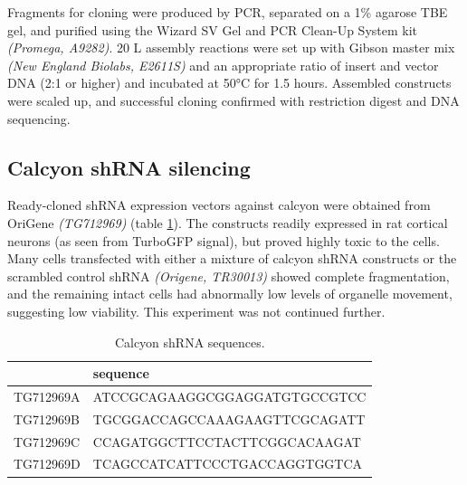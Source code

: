 \documentclass[
  12pt,
  a4paper,
]{book}
\begin{document}
Fragments for cloning were produced by PCR, separated on a 1\% agarose TBE gel, and purified using the Wizard SV Gel and PCR Clean-Up System kit \emph{(Promega, A9282)}. 20 \textmu{}L assembly reactions were set up with Gibson master mix \emph{(New England Biolabs, E2611S)} and an appropriate ratio of insert and vector DNA (2:1 or higher) and incubated at 50°C for 1.5 hours. Assembled constructs were scaled up, and successful cloning confirmed with restriction digest and DNA sequencing.

\begin{table}

\caption{\label{tab:primer-table}Gibson cloning primers.}
\centering
{}
\end{table}

\hypertarget{calcyon-shrna-silencing}{%
\subsection{Calcyon shRNA silencing}\label{calcyon-shrna-silencing}}

Ready-cloned shRNA expression vectors against calcyon were obtained from OriGene \emph{(TG712969)} (table \ref{tab:caly-tab}). The constructs readily expressed in rat cortical neurons (as seen from TurboGFP signal), but proved highly toxic to the cells. Many cells transfected with either a mixture of calcyon shRNA constructs or the scrambled control shRNA \emph{(Origene, TR30013)} showed complete fragmentation, and the remaining intact cells had abnormally low levels of organelle movement, suggesting low viability. This experiment was not continued further.

\begin{table}

\caption{\label{tab:caly-tab}Calcyon shRNA sequences.}
\centering
\begin{tabular}[t]{ll}
\toprule
  & sequence\\
\midrule
TG712969A & ATCCGCAGAAGGCGGAGGATGTGCCGTCC\\
TG712969B & TGCGGACCAGCCAAAGAAGTTCGCAGATT\\
TG712969C & CCAGATGGCTTCCTACTTCGGCACAAGAT\\
TG712969D & TCAGCCATCATTCCCTGACCAGGTGGTCA\\
\bottomrule
\end{tabular}
\end{table}
\end{document}
